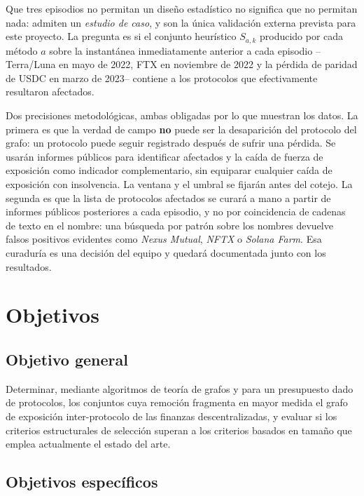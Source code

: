 \documentclass[journal]{IEEEtran}
\begin{document}
Que tres episodios no permitan un diseño estadístico no significa que no
permitan nada: admiten un \emph{estudio de caso}, y son la única validación
externa prevista para este proyecto. La pregunta es si el conjunto heurístico
$S_{a,k}$ producido por cada método $a$ sobre la instantánea inmediatamente anterior a cada
episodio --Terra/Luna en mayo de 2022, FTX en noviembre de 2022 y la pérdida de
paridad de USDC en marzo de 2023-- contiene a los protocolos que efectivamente
resultaron afectados.

Dos precisiones metodológicas, ambas obligadas por lo que muestran los datos. La
primera es que la verdad de campo \textbf{no} puede ser la desaparición del
protocolo del grafo: un protocolo puede seguir registrado después de sufrir
una pérdida. Se usarán informes públicos para identificar afectados y la caída
de fuerza de exposición como indicador complementario, sin equiparar cualquier
caída de exposición con insolvencia. La ventana y el umbral se fijarán antes
del cotejo. La
segunda es que la lista de protocolos afectados se curará a mano a partir de
informes públicos posteriores a cada episodio, y no por coincidencia de cadenas
de texto en el nombre: una búsqueda por patrón sobre los nombres devuelve falsos
positivos evidentes como \emph{Nexus Mutual}, \emph{NFTX} o \emph{Solana
Farm}. Esa curaduría es una decisión del equipo y quedará documentada junto con
los resultados.

\section{Objetivos}

\subsection{Objetivo general}

Determinar, mediante algoritmos de teoría de grafos y para un presupuesto dado
de protocolos, los conjuntos cuya remoción fragmenta en mayor medida el grafo de
exposición inter-protocolo de las finanzas descentralizadas, y evaluar si los
criterios estructurales de selección superan a los criterios basados en tamaño
que emplea actualmente el estado del arte.

\subsection{Objetivos específicos}
\end{document}
